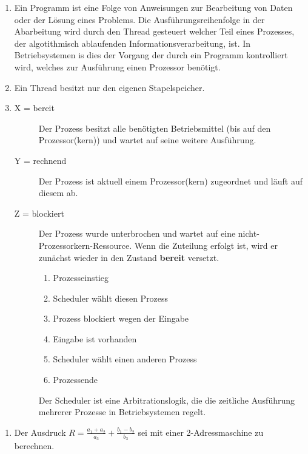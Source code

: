 \documentclass[ngerman]{fbi-aufgabenblatt}
\begin{document}
\begin{enumerate}
	\item Ein Programm ist eine Folge von Anweisungen zur Bearbeitung von Daten oder der Lösung eines Problems. Die Ausführungsreihenfolge in der Abarbeitung wird durch den Thread gesteuert welcher Teil eines Prozesses, der algotithmisch ablaufenden Informationsverarbeitung, ist. In Betriebsystemen is dies der Vorgang der durch ein Programm kontrolliert wird, welches zur Ausführung einen Prozessor benötigt.
	\item Ein Thread besitzt nur den eigenen Stapelspeicher.
	\setcounter{enumi}{3}
	\item 
	\begin{description} 
		\item[X = bereit] Der Prozess besitzt alle benötigten Betriebsmittel (bis auf den Prozessor(kern)) und wartet auf seine weitere Ausführung.
		\item[Y = rechnend] Der Prozess ist aktuell einem Prozessor(kern) zugeordnet und läuft auf diesem ab.
		\item[Z = blockiert] Der Prozess wurde unterbrochen und wartet auf eine nicht-Prozessorkern-Ressource. Wenn die Zuteilung erfolgt ist, wird er zunächst wieder in den Zustand \textbf{bereit} versetzt.
		\renewcommand{\theenumii}{\alph{enumii} =}
		\begin{enumerate}
   			\item Prozesseinstieg
   			\item Scheduler wählt diesen Prozess
   			\item Prozess blockiert wegen der Eingabe
   			\item Eingabe ist vorhanden
   			\item Scheduler wählt einen anderen Prozess
   			\item Prozessende
   		\end{enumerate}
	Der Scheduler ist eine Arbitrationslogik, die die zeitliche Ausführung mehrerer Prozesse in Betriebsystemen regelt.
	\end{description}
\end{enumerate}
%


\begin{enumerate}
	\item Der Ausdruck $R = \frac{a_{1} + a_{2}}{a_{3}} + \frac{b_{1} - b_{2}}{b_{3}}$ sei mit einer 2-Adressmaschine zu berechnen.
\end{enumerate}
\end{document}
